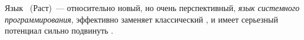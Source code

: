 \clearpage
{}\label{rust}

Язык \rust\ (Раст)\ --- относительно новый, но очень перспективный, \textit{язык
системного программирования}, эффективно заменяет классический \cb, и имеет
серьезный потенциал сильно подвинуть \cpp.

